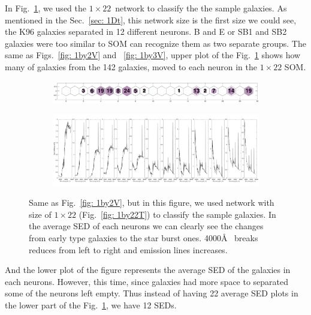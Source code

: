             In Fig.~\ref{fig: 1by22V}, we used the $1\times22$~network to classify the the sample galaxies.
            As mentioned in the Sec.~\ref{sec: 1Dt}, this network size is the first size we could see, the K96 galaxies separated in 12 different neurons.
            B and E or SB1 and SB2 galaxies were too similar to SOM can recognize them as two separate groups.
            The same as Figs.~\ref{fig: 1by2V} and ~\ref{fig: 1by3V}, upper plot of the Fig.~\ref{fig: 1by22V} shows how many of galaxies from the 142 galaxies, moved to each neuron in the $1\times22$ SOM.
            \begin{figure}
                \begin{subfigure}[b]{0.9\textwidth}
                    \centering
                    \includegraphics[width=\textwidth]{../images0.01/1d/hit_v_1_by_22.png}
                \end{subfigure}
                \hfill
                \begin{subfigure}[b]{0.9\textwidth}
                     \includegraphics[width=\textwidth]{../images0.01/1d/SED_total1by22.png}
                \end{subfigure}
                \caption{Same as Fig.~\ref{fig: 1by2V}, but in this figure, we used network with size of $1\times22$ (Fig.~\ref{fig: 1by22T}) to classify the sample galaxies. In the average SED of each neurons we can clearly see the changes from early type galaxies to the star burst ones. 4000\AA~ breaks reduces from left to right and emission lines increases.}
                \label{fig: 1by22V}
            \end{figure}
            And the lower plot of the figure represents the average SED of the galaxies in each neurons.
            However, this time, since galaxies had more space to separated some of the neurons left empty. 
            Thus instead of having 22 average SED plots in the lower part of the Fig.~\ref{fig: 1by22V}, we have 12 SEDs.
            
